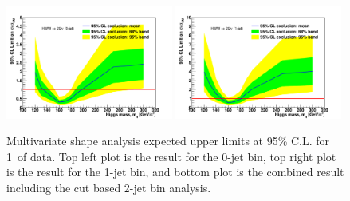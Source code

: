 \begin{figure}[!htbp]
\begin{center}
   \includegraphics[width=0.49\textwidth]{figures/limits_mva_shape_1ifb_0jet.pdf}
   \includegraphics[width=0.49\textwidth]{figures/limits_mva_shape_1ifb_1jet.pdf}
   \caption{Multivariate shape analysis expected upper limits at 95\% C.L. for 1\ifb\ of data. Top left plot 
   is the result for the 0-jet bin, top right plot is the result for the 1-jet bin, and 
   bottom plot is the combined result including the cut based 2-jet bin analysis.}
   \label{fig:mvashape_uls}
\end{center}
\end{figure}
